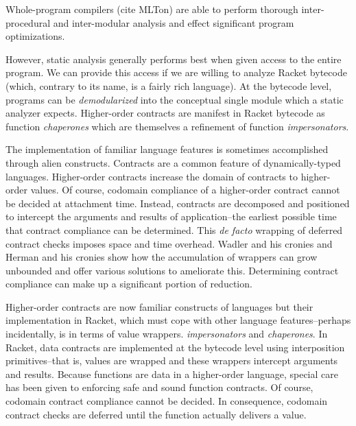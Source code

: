 \documentclass{sigplanconf}
\begin{document}

Whole-program compilers (cite MLTon) are able to perform thorough inter-procedural and inter-modular analysis and effect significant program optimizations.

However, static analysis generally performs best when given access to the entire program.
We can provide this access if we are willing to analyze Racket bytecode (which, contrary to its name, is a fairly rich language).
At the bytecode level, programs can be \emph{demodularized} into the conceptual single module which a static analyzer expects.
Higher-order contracts are manifest in Racket bytecode as function \emph{chaperones} which are themselves a refinement of function \emph{impersonators}.

The implementation of familiar language features is sometimes accomplished through alien constructs.
Contracts are a common feature of dynamically-typed languages.
Higher-order contracts \cite{findler2002contracts} increase the domain of contracts to higher-order values.
Of course, codomain compliance of a higher-order contract cannot be decided at attachment time.
Instead, contracts are decomposed and positioned to intercept the arguments and results of application--the earliest possible time that contract compliance can be determined.
This \emph{de facto} wrapping of deferred contract checks imposes space and time overhead.
Wadler and his cronies and Herman and his cronies \cite{wadler2009well,herman2010space} show how the accumulation of wrappers can grow unbounded and offer various solutions to ameliorate this.
Determining contract compliance can make up a significant portion of reduction.

Higher-order contracts \cite{findler2002contracts} are now familiar constructs of languages but their implementation in Racket, which must cope with other language features--perhaps incidentally, is in terms of value wrappers.
 \emph{impersonators} and \emph{chaperones}.
In Racket, data contracts are implemented at the bytecode level using interposition primitives--that is, values are wrapped and these wrappers intercept arguments and results.
Because functions are data in a higher-order language, special care has been given to enforcing safe and sound function contracts.
Of course, codomain contract compliance cannot be decided.
In consequence, codomain contract checks are deferred until the function actually delivers a value.
\end{document}

